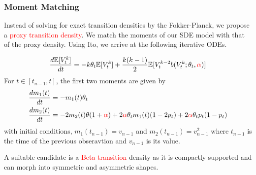 \documentclass[aspectratio=169]{beamer}\usepackage[utf8]{inputenc}
\newcommand{\E}{\mathbb{E}}
\begin{document}
\begin{frame}\frametitle{Moment Matching}
Instead of solving for exact transition densities by the Fokker-Planck, we propose a \textcolor{red}{proxy transition density}. We match the moments of our SDE model with that of the proxy density. Using Ito, we arrive at the following iterative ODEs.

\begin{equation}
\begin{split}
\frac{d \E[ V^k_t]}{dt} = - k \theta_t \E [ V^k_t] + \frac{k(k-1)}{2} \E [ V^{k-2}_t  b(V^k_t;\theta_t, \textcolor{red}{\alpha})]
\end{split}
\end{equation}
For $t\in [t_{n-1}, t]$, the first two moments are given by
\begin{equation}
\begin{split}
\frac{d m_1 (t)}{dt} &= - m_1(t)\theta_t \\
\frac{d m_2 (t)}{dt} &=  -2 m_2(t)\theta(1+\textcolor{red}{\alpha}) + 2\textcolor{red}{\alpha}\theta_t m_1(t)(1-2p_t) + 2 \textcolor{red}{\alpha}\theta_t p_t (1-p_t)\\
\end{split}
\end{equation}
with initial conditions, $m_1(t_{n-1})= v_{n-1}$ and $m_2(t_{n-1})= v_{n-1}^2$ where $t_{n-1}$ is the time of the previous obseravtion and $v_{n-1}$ is its value.

 A suitable candidate is a \textcolor{red}{Beta transition } density as it is compactly supported and can morph into symmetric and asymmetric shapes.

\end{frame}
\end{document}

